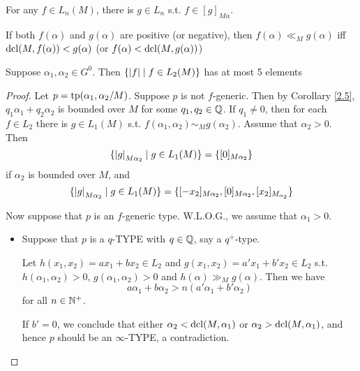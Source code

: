 \documentclass[11pt]{article}
\begin{document}
For any \(f\in L_n(M)\), there is \(g\in L_n\) s.t. \(f\in[g]_{M\alpha}\).

\begin{remark}
If both \(f(\alpha)\) and \(g(\alpha)\) are positive (or negative),
then \(f(\alpha)\ll_Mg(\alpha)\) iff \(\operatorname{dcl}(M,f(\alpha))<g(\alpha)\) (or \(f(\alpha)<\operatorname{dcl}(M,g(\alpha))\))
\end{remark}

\begin{lemma}[]
Suppose \(\alpha_1,\alpha_2\in G^0\). Then \(\{\abs{f}\mid f\in L_2(M)\}\) has at most 5 elements
\end{lemma}

\begin{proof}
Let \(p=\operatorname{tp}(\alpha_1,\alpha_2/M)\). Suppose \(p\) is not \(f\)-generic. Then by Corollary
\ref{2.5}, \(q_1\alpha_1+q_2\alpha_2\) is bounded over \(M\) for some \(q_1,q_2\in\mathbb{Q}\).
If \(q_1\neq 0\), then for each \(f\in L_2\) there is \(g\in L_1(M)\)
s.t. \(f(\alpha_1,\alpha_2)\sim_Mg(\alpha_2)\). Assume that \(\alpha_2>0\). Then
\begin{equation*}
\{\abs{g}_{M\alpha_2}\mid g\in L_1(M)\}=\{[0]_{M\alpha_2}\}
\end{equation*}
if \(\alpha_2\) is bounded over \(M\), and
\begin{equation*}
\{\abs{g}_{M\alpha_2}\mid g\in L_1(M)\}=\{[-x_2]_{M\alpha_2},[0]_{M\alpha_2},
[x_2]_{M_{\alpha_2}}\}
\end{equation*}

Now suppose that \(p\) is an \(f\)-generic type. W.L.O.G., we assume that \(\alpha_1>0\).
\begin{itemize}
\item Suppose that \(p\) is a \(q\)-TYPE with \(q\in\mathbb{Q}\), say a \(q^+\)-type.

Let \(h(x_1,x_2)=ax_1+bx_2\in L_2\) and \(g(x_1,x_2)=a'x_1+b'x_2\in L_2\)
s.t. \(h(\alpha_1,\alpha_2)>0\), \(g(\alpha_1,\alpha_2)>0\) and \(h(\alpha)\gg_Mg(\alpha)\).
Then we have
\begin{equation*}
a\alpha_1+b\alpha_2>n(a'\alpha_1+b'\alpha_2)
\end{equation*}
for all \(n\in\mathbb{N}^+\).

If \(b'=0\), we conclude that either \(\alpha_2<\operatorname{dcl}(M,\alpha_1)\)
or \(\alpha_2>\operatorname{dcl}(M,\alpha_1)\), and hence \(p\) should be an \(\infty\)-TYPE, a
contradiction.


\end{itemize}
\end{proof}
\end{document}

